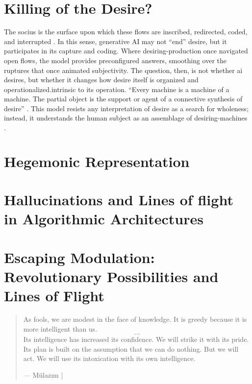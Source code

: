 \section{Killing of the Desire?}

The socius is the surface upon which these flows are inscribed, redirected, coded, and interrupted \parencite[11–13]{deleuze1983}. In this sense, generative AI may not “end” desire, but it participates in its capture and coding. Where desiring-production once navigated open flows, the model provides preconfigured answers, smoothing over the ruptures that once animated subjectivity. The question, then, is not whether \gls{ai} desires, but whether it changes how desire itself is organized and operationalized.intrinsic to its operation. “Every machine is a machine of a machine. The partial object is the support or agent of a connective synthesis of desire” \parencite[6]{deleuze1983}. This model resists any interpretation of desire as a search for wholeness; instead, it understands the human subject as an assemblage of desiring-machines \parencite[10]{deleuze1983}.

\section{Hegemonic Representation}
\section{Hallucinations and Lines of flight in Algorithmic Architectures}



\section{Escaping Modulation: Revolutionary Possibilities and Lines of Flight}

\begin{quote}

	As fools, we are modest in the face of knowledge. It is greedy because it is more intelligent than us. \[...\] Its intelligence has increased its confidence. We will strike it with its pride. Its plan is built on the assumption that we can do nothing. But we will act. We will use its intoxication with its own intelligence.

	— Mülazım | \cite[135]{anar2022}
\end{quote}




